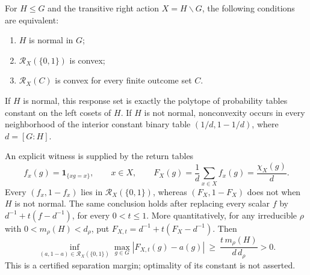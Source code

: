\begin{theorem}
\label{thm:r75-normality-convexity}
For $H\le G$ and the transitive right action $X=H\backslash G$, the
following conditions are equivalent:
\begin{enumerate}
\item $H$ is normal in $G$;
\item $\mathcal R_X(\{0,1\})$ is convex;
\item $\mathcal R_X(C)$ is convex for every finite outcome set $C$.
\end{enumerate}
If $H$ is normal, this response set is exactly the polytope of
probability tables constant on the left cosets of $H$. If $H$ is not
normal, nonconvexity occurs in every neighborhood of the interior
constant binary table $(1/d,1-1/d)$, where $d=[G:H]$.

An explicit witness is supplied by the return tables
\[
 f_x(g)=\mathbf1_{\{xg=x\}},\qquad x\in X,
 \qquad
 F_X(g)=\frac1d\sum_{x\in X}f_x(g)=\frac{\chi_X(g)}d.
\]
Every $(f_x,1-f_x)$ lies in $\mathcal R_X(\{0,1\})$, whereas
$(F_X,1-F_X)$ does not when $H$ is not normal. The same conclusion
holds after replacing every scalar $f$ by $d^{-1}+t(f-d^{-1})$, for
every $0<t\le1$.
More quantitatively, for any irreducible $\rho$ with
$0<m_\rho(H)<d_\rho$, put
$F_{X,t}=d^{-1}+t(F_X-d^{-1})$. Then
\begin{equation}\label{eq:r75-nonconvexity-margin}
 \inf_{(a,1-a)\in\mathcal R_X(\{0,1\})}
       \max_{g\in G}|F_{X,t}(g)-a(g)|
 \ \ge\ \frac{t\,m_\rho(H)}{d\,d_\rho}>0.
\end{equation}
This is a certified separation margin; optimality of its constant
is not asserted.
\end{theorem}

